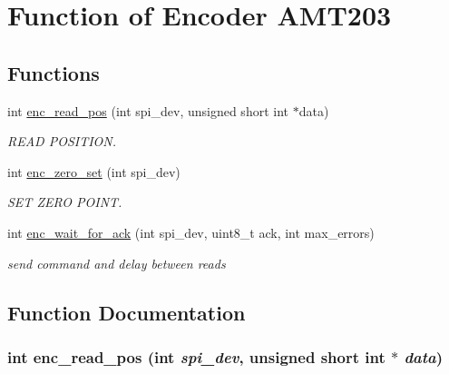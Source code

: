 \hypertarget{group__enc}{
\section{Function of Encoder AMT203}
\label{group__enc}
}
\subsection*{Functions}
\begin{DoxyCompactItemize}
\item 
int \hyperlink{group__enc_ga813c09cc4d9af8b357fe440a9438e685}{enc\_\-read\_\-pos} (int spi\_\-dev, unsigned short int $\ast$data)
\begin{DoxyCompactList}\small\item\em READ POSITION. \item\end{DoxyCompactList}\item 
int \hyperlink{group__enc_gaebbe7b9d3c2571f7481cefacbe36c498}{enc\_\-zero\_\-set} (int spi\_\-dev)
\begin{DoxyCompactList}\small\item\em SET ZERO POINT. \item\end{DoxyCompactList}\item 
int \hyperlink{group__enc_gad82fb44f2e735628ec95e003e4a1f93c}{enc\_\-wait\_\-for\_\-ack} (int spi\_\-dev, uint8\_\-t ack, int max\_\-errors)
\begin{DoxyCompactList}\small\item\em send command and delay between reads \item\end{DoxyCompactList}\end{DoxyCompactItemize}


\subsection{Function Documentation}
\hypertarget{group__enc_ga813c09cc4d9af8b357fe440a9438e685}{
\subsubsection[{enc\_\-read\_\-pos}]{\setlength{\rightskip}{0pt plus 5cm}int enc\_\-read\_\-pos (int {\em spi\_\-dev}, \/  unsigned short int $\ast$ {\em data})}}
\label{group__enc_ga813c09cc4d9af8b357fe440a9438e685}


